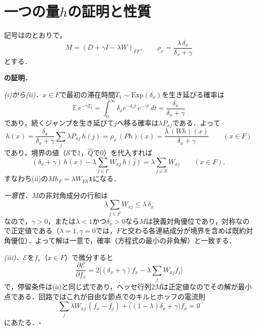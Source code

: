 \section{一つの量$h$の証明と性質}
\label{sec:app_h19}
記号はのとおりで，
\begin{equation*}
M=(D+\gamma I-\lambda W)_{FF},\qquad\rho_x=\frac{\lambda\,\delta_x}{\delta_x+\gamma}
\end{equation*}
とする．

\textbf{\TFaces{}の証明．}

\textit{(i)から(ii)．}$x\in F$で最初の滞在時間$T_1\sim\mathrm{Exp}(\delta_x)$を生き延びる確率は
\begin{equation*}
\mathbb{E}\,e^{-\gamma T_1}=\int_0^{\infty}\delta_x e^{-\delta_x t}\,e^{-\gamma t}\,dt=\frac{\delta_x}{\delta_x+\gamma}
\end{equation*}
であり，続くジャンプを生き延びて$j$へ移る確率は$\lambda P_{xj}$である．よって
\begin{equation*}
h(x)=\frac{\delta_x}{\delta_x+\gamma}\sum_j\lambda P_{xj}\,h(j)=\rho_x\,(Ph)(x)=\frac{\lambda\,(Wh)(x)}{\delta_x+\gamma}\qquad(x\in F)
\end{equation*}
であり，境界の値（$\mathcal{S}$で1，$\hat{Q}$で0）を代入すれば
\begin{equation*}
(\delta_x+\gamma)\,h(x)-\lambda\sum_{j\in F}W_{xj}\,h(j)=\lambda\sum_{j\in\mathcal{S}}W_{xj}\qquad(x\in F),
\end{equation*}
すなわち(ii)の$Mh_F=\lambda W_{F\mathcal{S}}\mathbf{1}$になる．

\textit{一意性．}$M$の非対角成分の行和は
\begin{equation*}
\lambda\sum_{j\in F}W_{xj}\le\lambda\,\delta_x
\end{equation*}
なので，$\gamma>0$，または$\lambda<1$かつ$\delta_x>0$なら$M$は狭義対角優位であり，対称なので正定値である（$\lambda{=}1,\gamma{=}0$では，$F$と交わる各連結成分が境界を含めば既約対角優位）．よって解は一意で，確率（方程式の最小の非負解）と一致する．

\textit{(iii)．}$\mathcal{E}$を$f_x$（$x\in F$）で微分すると
\begin{equation*}
\frac{\partial\mathcal{E}}{\partial f_x}=2\Big[(\delta_x+\gamma)f_x-\lambda\sum_jW_{xj}f_j\Big]
\end{equation*}
で，停留条件は(ii)と同じ式であり，ヘッセ行列$2M$は正定値なのでその解が最小点である．回路ではこれが自由な節点でのキルヒホッフの電流則
\begin{equation*}
\sum_j\lambda W_{xj}\,(f_x-f_j)+\big((1-\lambda)\delta_x+\gamma\big)f_x=0
\end{equation*}
にあたる．$\square$

